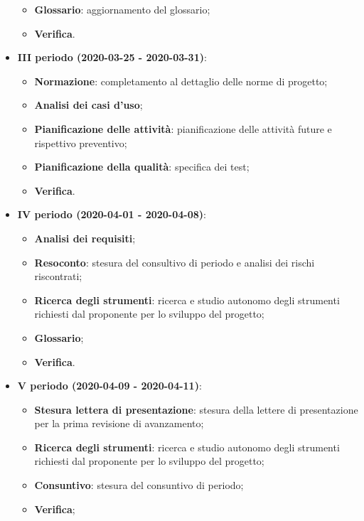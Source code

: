 \documentclass[../piano-di-progetto.tex]{subfiles}
\begin{document}
\begin{itemize}
\begin{itemize}
                \item \textbf{Glossario}: aggiornamento del glossario;
                \item \textbf{Verifica}.
            \end{itemize}
        \item \textbf{III periodo (2020-03-25 - 2020-03-31)}:
        \begin{itemize}
            \item \textbf{Normazione}: completamento al dettaglio delle norme di progetto;
            \item \textbf{Analisi dei casi d'uso};
            \item \textbf{Pianificazione delle attività}: pianificazione delle attività future e rispettivo preventivo;
            \item \textbf{Pianificazione della qualità}: specifica dei test;
            \item \textbf{Verifica}.
        \end{itemize}
        \item \textbf{IV periodo (2020-04-01 - 2020-04-08)}:
        \begin{itemize}
            \item \textbf{Analisi dei requisiti};
            \item \textbf{Resoconto}: stesura del consultivo di periodo e analisi dei rischi riscontrati;
            \item \textbf{Ricerca degli strumenti}: ricerca e studio autonomo degli strumenti richiesti dal proponente per lo sviluppo del progetto;
            \item \textbf{Glossario};
            \item \textbf{Verifica}.

        \end{itemize}

        \item \textbf{V periodo (2020-04-09 - 2020-04-11)}:
        \begin{itemize}
            \item \textbf{Stesura lettera di presentazione}: stesura della lettere di presentazione per la prima revisione di avanzamento;
            \item \textbf{Ricerca degli strumenti}: ricerca e studio autonomo degli strumenti richiesti dal proponente per lo sviluppo del progetto;
            \item \textbf{Consuntivo}: stesura del consuntivo di periodo;
            \item \textbf{Verifica};
        \end{itemize}
    \end{itemize}
\end{document}
